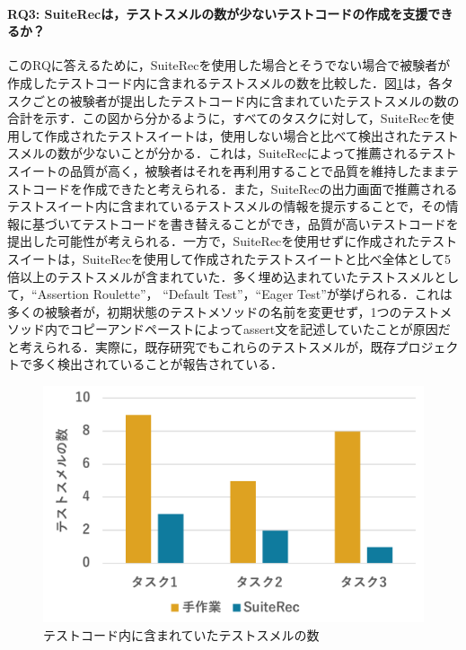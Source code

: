 \documentclass[12pt]{jarticle} %
\begin{document}
\paragraph{RQ3: {\sf SuiteRec}は，テストスメルの数が少ないテストコードの作成を支援できるか？}このRQに答えるために，{\sf SuiteRec}を使用した場合とそうでない場合で被験者が作成したテストコード内に含まれるテストスメルの数を比較した．図\ref{smell}は，各タスクごとの被験者が提出したテストコード内に含まれていたテストスメルの数の合計を示す．この図から分かるように，すべてのタスクに対して，{\sf SuiteRec}を使用して作成されたテストスイートは，使用しない場合と比べて検出されたテストスメルの数が少ないことが分かる．これは，{\sf SuiteRec}によって推薦されるテストスイートの品質が高く，被験者はそれを再利用することで品質を維持したままテストコードを作成できたと考えられる．また，{\sf SuiteRec}の出力画面で推薦されるテストスイート内に含まれているテストスメルの情報を提示することで，その情報に基づいてテストコードを書き替えることができ，品質が高いテストコードを提出した可能性が考えられる．一方で，{\sf SuiteRec}を使用せずに作成されたテストスイートは，{\sf SuiteRec}を使用して作成されたテストスイートと比べ全体として5倍以上のテストスメルが含まれていた．多く埋め込まれていたテストスメルとして，``Assertion Roulette''， ``Default Test''，``Eager Test''が挙げられる．これは多くの被験者が，初期状態のテストメソッドの名前を変更せず，1つのテストメソッド内でコピーアンドペーストによってassert文を記述していたことが原因だと考えられる．実際に，既存研究でもこれらのテストスメルが，既存プロジェクトで多く検出されていることが報告されている\cite{Peruma}．

\begin{figure}[htbp]
\begin{center}
\includegraphics[width=12cm]{pic/smells.pdf}
\caption{テストコード内に含まれていたテストスメルの数}
\label{smell}
\end{center}
\end{figure}
\end{document}
